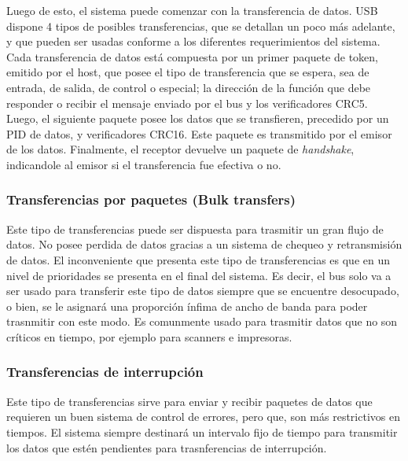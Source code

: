 	Luego de esto, el sistema puede comenzar con la transferencia de datos. USB dispone 4 tipos de posibles transferencias, que se detallan un poco más adelante, y que pueden ser usadas conforme a los diferentes requerimientos del sistema.\\
	
	Cada transferencia de datos está compuesta por un primer paquete de token, emitido por el host, que posee el tipo de transferencia que se espera, sea de entrada, de salida, de control o especial; la dirección de la función que debe responder o recibir el mensaje enviado por el bus y los verificadores CRC5.\\
	
	Luego, el siguiente paquete posee los datos que se transfieren, precedido por un PID de datos, y verificadores CRC16. Este paquete es transmitido por el emisor de los datos. Finalmente, el receptor devuelve un paquete de {\it handshake}, indicandole al emisor si el transferencia fue efectiva o no.\\
	
	\subsubsection*{Transferencias por paquetes (Bulk transfers)}
		Este tipo de transferencias puede ser dispuesta para trasmitir un gran flujo de datos. No posee perdida de datos gracias a un sistema de chequeo y retransmisión de datos. El inconveniente que presenta este tipo de transferencias es que en un nivel de prioridades se presenta en el final del sistema. Es decir, el bus solo va a ser usado para transferir este tipo de datos siempre que se encuentre desocupado, o bien, se le asignará una proporción ínfima de ancho de banda para poder trasnmitir con este modo. Es comunmente usado para trasmitir datos que no son críticos en tiempo, por ejemplo para scanners e impresoras.\\
	
	\subsubsection*{Transferencias de interrupción}
		Este tipo de transferencias sirve para enviar y recibir paquetes de datos que requieren un buen sistema de control de errores, pero que, son más restrictivos en tiempos. El sistema siempre destinará un intervalo fijo de tiempo para transmitir los datos que estén pendientes para trasnferencias de interrupción.\\
	
